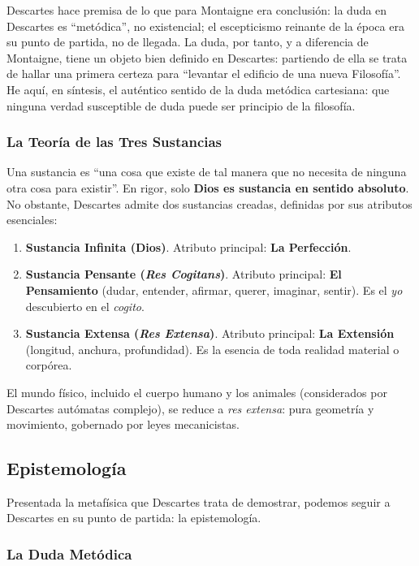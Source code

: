\documentclass[10pt]{article}
\begin{document}
Descartes hace premisa de lo que para Montaigne era conclusión: la duda en Descartes es ``metódica'', no existencial; el escepticismo reinante de la época era su punto de partida,
no de llegada. La duda, por tanto, y a diferencia de Montaigne, tiene un objeto bien definido en Descartes: partiendo de ella se trata de hallar una primera certeza para ``levantar
el edificio de una nueva Filosofía''. He aquí, en síntesis, el auténtico sentido de la duda metódica cartesiana: que ninguna verdad susceptible de duda puede ser principio de la
filosofía.

\subsubsection{La Teoría de las Tres Sustancias}

Una sustancia es ``una cosa que existe de tal manera que no necesita de ninguna otra cosa para existir''. En rigor, solo \textbf{Dios es sustancia en sentido absoluto}. 
No obstante, Descartes admite dos sustancias creadas, definidas por sus atributos esenciales:

\begin{enumerate}
  \item \textbf{Sustancia Infinita (Dios)}. Atributo principal: \textbf{La Perfección}.
  \item \textbf{Sustancia Pensante (\textit{Res Cogitans})}. Atributo principal: \textbf{El Pensamiento} (dudar, entender, afirmar, querer, imaginar, sentir). Es el \textit{yo} descubierto en el \textit{cogito}.
  \item \textbf{Sustancia Extensa (\textit{Res Extensa})}. Atributo principal: \textbf{La Extensión} (longitud, anchura, profundidad). Es la esencia de toda realidad material o corpórea.
\end{enumerate}

El mundo físico, incluido el cuerpo humano y los animales (considerados por Descartes autómatas complejo), se reduce a \textit{res extensa}: pura geometría y movimiento, gobernado por leyes mecanicistas.

\subsection{Epistemología}

Presentada la metafísica que Descartes trata de demostrar, podemos seguir a Descartes en su punto de partida: la epistemología.

\subsubsection{La Duda Metódica}
\end{document}

